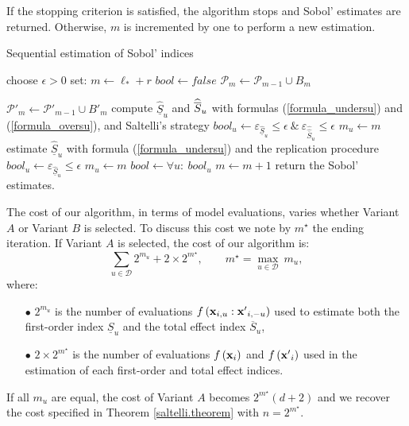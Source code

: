 If the stopping criterion is satisfied, the algorithm stops and Sobol' estimates are returned. Otherwise, $m$ is incremented by one to perform a new estimation. 
\begin{algorithm}[t]
\caption{Sequential estimation of Sobol' indices}
\begin{algorithmic}[1]
\vspace*{0.2cm}
\State choose $\epsilon >0$
\State set: $m \leftarrow \ell_*+r$
\State $bool \leftarrow false$
\State $\mathcal{P}_m \leftarrow \mathcal{P}_{m-1} \cup B_m$

\hspace*{-0.3cm} $\mathcal{P}'_m \leftarrow \mathcal{P}'_{m-1} \cup {B'}_m$
\State compute $\widehat{\underline{S}}_u$ and $\widehat{\ov{$S$}}_u$ with formulas (\ref{formula_undersu}) and (\ref{formula_oversu}), and Saltelli's strategy
\State $bool_u \leftarrow \varepsilon_{\widehat{\underline{S}}_u} \leq \epsilon \ \& \ \varepsilon_{\widehat{\widehat{\overline{S}}}_u} \leq \epsilon$
\State $m_u \leftarrow m$
\EndIf
\EndIf
{}
\State estimate $\widehat{\underline{S}}_u$ with formula (\ref{formula_undersu}) and the replication procedure
\State $bool_u \leftarrow \varepsilon_{\widehat{\underline{S}}_u} \leq \epsilon$
\State $m_u \leftarrow m$
\EndIf
\EndIf
\EndFor
\State $bool \leftarrow \forall u: \ bool_u$
\State $m \leftarrow m + 1$
\EndWhile
\State return the Sobol' estimates.
\end{algorithmic}
\label{recursive.algorithm}
\end{algorithm}
\bigskip

The cost of our algorithm, in terms of model evaluations, varies whether Variant $A$ or Variant $B$ is selected. To discuss this cost we note by $m^\star$ the ending iteration. If Variant $A$ is selected, the cost of our algorithm is:
\[\sum \limits_{u \in \mathcal{D}} 2^{m_u} + 2 \times 2^{m^{\star}}, \qquad m^\star= \max \limits_{u \in \mathcal{D}} \ m_u,\]
where: 
\begin{itemize}
\item[$\bullet$] $2^{m_u}$ is the number of evaluations $f\left(\boldsymbol{\mathbf{x}}_{i,u}:{\boldsymbol{\mathbf{x}}'}_{i,-u}\right)$ used to estimate both the first-order index $\underline{S}_u$ and the total effect index $\overline{S}_u$,
\item[$\bullet$] $2 \times 2^{m^{\star}}$ is the number of evaluations $f\left(\boldsymbol{\mathbf{x}}_{i}\right)$ and $f\left({\boldsymbol{\mathbf{x}}'}_{i}\right)$ used in the estimation of each first-order and total effect indices.
\end{itemize}
If all $m_u$ are equal, the cost of Variant $A$ becomes $2^{m^\star}(d+2)$ and we recover the cost specified in Theorem \ref{saltelli.theorem} with $n=2^{m^\star}$.

